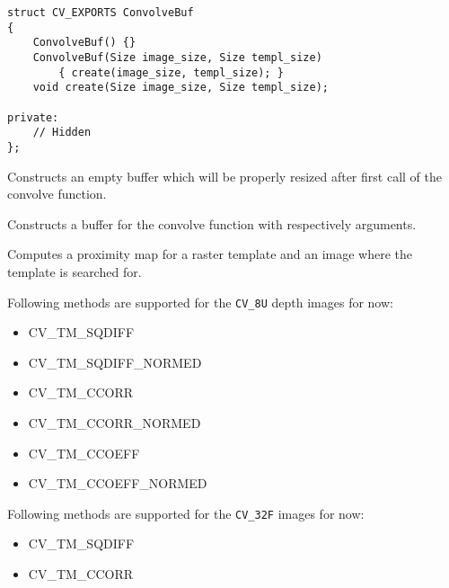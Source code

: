 \begin{lstlisting}
struct CV_EXPORTS ConvolveBuf
{
    ConvolveBuf() {}
    ConvolveBuf(Size image_size, Size templ_size) 
        { create(image_size, templ_size); }
    void create(Size image_size, Size templ_size);

private:
    // Hidden
};
\end{lstlisting}



Constructs an empty buffer which will be properly resized after first call of the convolve function.

Constructs a buffer for the convolve function with respectively arguments.


Computes a proximity map for a raster template and an image where the template is searched for.


\begin{description}
\end{description}

Following methods are supported for the \texttt{CV\_8U} depth images for now:
\begin{itemize}
\item CV\_TM\_SQDIFF \item CV\_TM\_SQDIFF\_NORMED \item CV\_TM\_CCORR \item CV\_TM\_CCORR\_NORMED \item CV\_TM\_CCOEFF \item CV\_TM\_CCOEFF\_NORMED 
\end{itemize}
Following methods are supported for the \texttt{CV\_32F} images for now:
\begin{itemize}
\item CV\_TM\_SQDIFF \item CV\_TM\_CCORR
\end{itemize}

